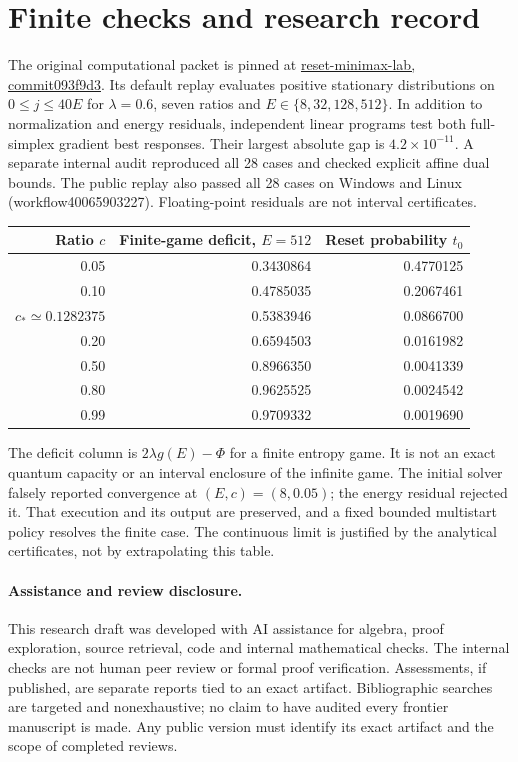 \documentclass[11pt]{article}
\begin{document}
\section{Finite checks and research record}
The original computational packet is pinned at \href{https://github.com/lluiseriksson/reset-minimax-lab/tree/093f9d34e3cecfe63a1a6cec0ac46eafdcd68412}{reset-minimax-lab, commit093f9d3}. Its default replay evaluates positive stationary distributions on $0\le j\le40E$ for $\lambda=0.6$, seven ratios and $E\in\{8,32,128,512\}$. In addition to normalization and energy residuals, independent linear programs test both full-simplex gradient best responses. Their largest absolute gap is $4.2\times10^{-11}$. A separate internal audit reproduced all 28 cases and checked explicit affine dual bounds. The public replay also passed all 28 cases on Windows and Linux (workflow40065903227). Floating-point residuals are not interval certificates.

\begin{center}
\begin{tabular}{@{}rrr@{}}\toprule
Ratio $c$ & Finite-game deficit, $E=512$ & Reset probability $t_0$\\\midrule
0.05 &0.3430864&0.4770125\\
0.10 &0.4785035&0.2067461\\
$c_*\simeq0.1282375$&0.5383946&0.0866700\\
0.20 &0.6594503&0.0161982\\
0.50 &0.8966350&0.0041339\\
0.80 &0.9625525&0.0024542\\
0.99 &0.9709332&0.0019690\\\bottomrule
\end{tabular}
\end{center}
The deficit column is $2\lambda g(E)-\Phi$ for a finite entropy game. It is not an exact quantum capacity or an interval enclosure of the infinite game. The initial solver falsely reported convergence at $(E,c)=(8,0.05)$; the energy residual rejected it. That execution and its output are preserved, and a fixed bounded multistart policy resolves the finite case. The continuous limit is justified by the analytical certificates, not by extrapolating this table.

\paragraph{Assistance and review disclosure.}
This research draft was developed with AI assistance for algebra, proof exploration, source retrieval, code and internal mathematical checks. The internal checks are not human peer review or formal proof verification. Assessments, if published, are separate reports tied to an exact artifact. Bibliographic searches are targeted and nonexhaustive; no claim to have audited every frontier manuscript is made. Any public version must identify its exact artifact and the scope of completed reviews.
\end{document}

